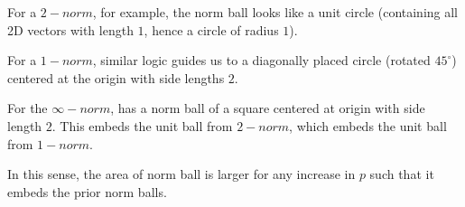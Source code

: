 \begin{bindenum}
    \item For a $2-norm$, for example, the norm ball looks like a unit circle (containing all 2D vectors with length $1$, hence a circle of radius $1$).
    \item For a $1-norm$, similar logic guides us to a diagonally placed circle (rotated $45^\circ$) centered at the origin with side lengths $2$.
    \item For the $\infty-norm$, has a norm ball of a square centered at origin with side length $2$. This embeds the unit ball from $2-norm$, which embeds the unit ball from $1-norm$.
\end{bindenum}
In this sense, the area of norm ball is larger for any increase in $p$ such that it embeds the prior norm balls.

